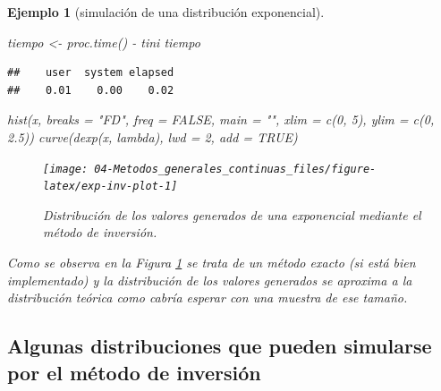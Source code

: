 \documentclass[
]{book}
\newenvironment{Shaded}{\begin{snugshade}}{\end{snugshade}}
\newcommand{\AttributeTok}[1]{\textcolor[rgb]{0.77,0.63,0.00}{#1}}
\newcommand{\ConstantTok}[1]{\textcolor[rgb]{0.00,0.00,0.00}{#1}}
\newcommand{\DecValTok}[1]{\textcolor[rgb]{0.00,0.00,0.81}{#1}}
\newcommand{\FloatTok}[1]{\textcolor[rgb]{0.00,0.00,0.81}{#1}}
\newcommand{\FunctionTok}[1]{\textcolor[rgb]{0.00,0.00,0.00}{#1}}
\newcommand{\NormalTok}[1]{#1}
\newcommand{\OtherTok}[1]{\textcolor[rgb]{0.56,0.35,0.01}{#1}}
\newcommand{\SpecialCharTok}[1]{\textcolor[rgb]{0.00,0.00,0.00}{#1}}
\newcommand{\StringTok}[1]{\textcolor[rgb]{0.31,0.60,0.02}{#1}}
\theoremstyle{break}
\newtheorem{example}{Ejemplo}[chapter]
\theoremstyle{nonumberplain}
\begin{document}
\begin{example}[simulación de una distribución exponencial]
\begin{Shaded}
\begin{Highlighting}[]
\NormalTok{tiempo }\OtherTok{\textless{}{-}} \FunctionTok{proc.time}\NormalTok{() }\SpecialCharTok{{-}}\NormalTok{ tini}
\NormalTok{tiempo}
\end{Highlighting}
\end{Shaded}

\begin{verbatim}
##    user  system elapsed 
##    0.01    0.00    0.02
\end{verbatim}

\begin{Shaded}
\begin{Highlighting}[]
\FunctionTok{hist}\NormalTok{(x, }\AttributeTok{breaks =} \StringTok{"FD"}\NormalTok{, }\AttributeTok{freq =} \ConstantTok{FALSE}\NormalTok{, }
        \AttributeTok{main =} \StringTok{""}\NormalTok{, }\AttributeTok{xlim =} \FunctionTok{c}\NormalTok{(}\DecValTok{0}\NormalTok{, }\DecValTok{5}\NormalTok{), }\AttributeTok{ylim =} \FunctionTok{c}\NormalTok{(}\DecValTok{0}\NormalTok{, }\FloatTok{2.5}\NormalTok{))}
\FunctionTok{curve}\NormalTok{(}\FunctionTok{dexp}\NormalTok{(x, lambda), }\AttributeTok{lwd =} \DecValTok{2}\NormalTok{, }\AttributeTok{add =} \ConstantTok{TRUE}\NormalTok{)}
\end{Highlighting}
\end{Shaded}

\begin{figure}[!htb]

{\centering \texttt{[image: 04-Metodos\_generales\_continuas\_files/figure-latex/exp-inv-plot-1]} 

}

\caption{Distribución de los valores generados de una exponencial mediante el método de inversión.}\label{fig:exp-inv-plot}
\end{figure}

Como se observa en la Figura \ref{fig:exp-inv-plot} se trata de un método exacto (si está bien implementado) y la distribución de los valores generados se aproxima a la distribución teórica como cabría esperar con una muestra de ese tamaño.
\end{example}

\hypertarget{algunas-distribuciones-que-pueden-simularse-por-el-muxe9todo-de-inversiuxf3n}{%
\subsection{Algunas distribuciones que pueden simularse por el método de inversión}\label{algunas-distribuciones-que-pueden-simularse-por-el-muxe9todo-de-inversiuxf3n}}
\end{document}
